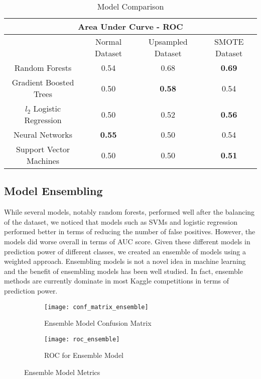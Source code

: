 \documentclass[twoside,11pt]{article}
\begin{document}
\begin{table}[h]
\centering
\caption{Model Comparison}
\label{model_results}
\begin{tabular}{|c||c|c|c|}
  \hline
  \multicolumn{4}{|c|}{Area Under Curve - ROC} \\
  \hline
  & Normal Dataset& Upsampled Dataset & SMOTE Dataset \\
  \hline
  Random Forests  & 0.54 & 0.68 & \textbf{0.69} \\
  Gradient Boosted Trees   & 0.50 & \textbf{0.58} & 0.54 \\
  $l_2$ Logistic Regression  & 0.50 & 0.52 & \textbf{0.56} \\
  Neural Networks & \textbf{0.55} & 0.50 & 0.54\\
  Support Vector Machines & 0.50 & 0.50 & \textbf{0.51} \\
  \hline
\end{tabular}
\end{table}
\subsection*{Model Ensembling}
While several models, notably random forests, performed well after the balancing
of the dataset, we noticed that models such as SVMs and logistic regression
performed better in terms of reducing the number of false positives. However,
the models did worse overall in terms of AUC score. Given these different
models in prediction power of different classes, we created an ensemble of
models using a weighted approach. Ensembling models is not a novel idea in
machine learning and the benefit of ensembling models has been well
studied.  In fact, ensemble methods are currently dominate in most Kaggle
competitions in terms of prediction power. \citep{ensemblingModels} 

\begin{figure}[h]
\centering
\begin{subfigure}{.5\textwidth}
  \centering
  \texttt{[image: conf\_matrix\_ensemble]}
  \caption{Ensemble Model Confusion Matrix}
  \label{fig:cmatrix_ensemble}
\end{subfigure}%
\begin{subfigure}{.5\textwidth}
  \centering
  \texttt{[image: roc\_ensemble]}
  \caption{ROC for Ensemble Model}
  \label{fig:roc_ensemble}
\end{subfigure}
\caption{Ensemble Model Metrics}
\label{fig:ensemble_model}
\end{figure}
\end{document}

